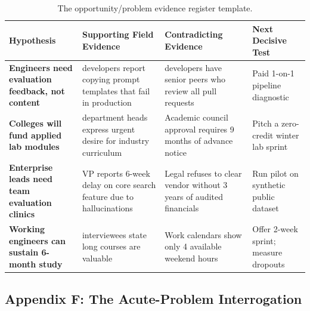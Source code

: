 \begin{table}[t]
\centering
\small
\begin{tabularx}{\textwidth}{>{\RaggedRight\bfseries}p{3.2cm} >{\RaggedRight}X >{\RaggedRight}X >{\RaggedRight}p{3.2cm}}
\toprule
Hypothesis & Supporting Field Evidence & Contradicting Evidence & Next Decisive Test \\
\midrule
Engineers need evaluation feedback, not content & 4 developers report copying prompt templates that fail in production & 6 developers have senior peers who review all pull requests & Paid 1-on-1 pipeline diagnostic \\
\addlinespace
Colleges will fund applied lab modules & 2 department heads express urgent desire for industry curriculum & Academic council approval requires 9 months of advance notice & Pitch a zero-credit winter lab sprint \\
\addlinespace
Enterprise leads need team evaluation clinics & VP reports 6-week delay on core search feature due to hallucinations & Legal refuses to clear vendor without 3 years of audited financials & Run pilot on synthetic public dataset \\
\addlinespace
Working engineers can sustain 6-month study & 12 interviewees state long courses are valuable & Work calendars show only 4 available weekend hours & Offer 2-week sprint; measure dropouts \\
\bottomrule
\end{tabularx}
\caption{The opportunity/problem evidence register template.}
\label{tab:ch6_evidence_register}
\end{table}

\subsection*{Appendix F: The Acute-Problem Interrogation}

